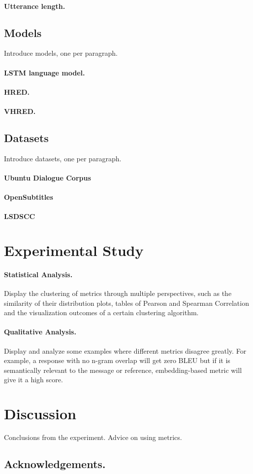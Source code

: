 \documentclass[runningheads]{llncs}
\begin{document}
    \paragraph{Utterance length.}

    \subsection{Models}
    Introduce models, one per paragraph.
    \paragraph{LSTM language model.}
    \paragraph{HRED.}
    \paragraph{VHRED.}

    \subsection{Datasets}
    Introduce datasets, one per paragraph.
    \paragraph{Ubuntu Dialogue Corpus}
    \paragraph{OpenSubtitles}
    \paragraph{LSDSCC}


    \section{Experimental Study}
    \paragraph{Statistical Analysis.}
    Display the clustering of metrics through multiple perspectives,
    such as the similarity of their distribution plots, tables of Pearson and Spearman Correlation
    and the visualization outcomes of a certain clustering algorithm.

    \paragraph{Qualitative Analysis.}
    Display and analyze some examples where different metrics disagree greatly.
    For example, a response with no n-gram overlap will get zero BLEU but if it is semantically
    relevant to the message or reference, embedding-based metric will give it a high score.

    \section{Discussion}
    Conclusions from the experiment.
    Advice on using metrics.

    \subsection*{Acknowledgements.}

    
    
\end{document}

